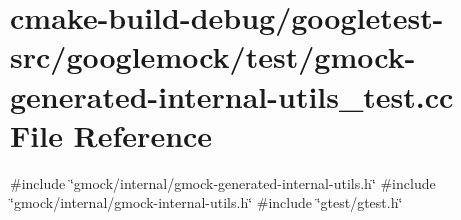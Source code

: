 \hypertarget{gmock-generated-internal-utils__test_8cc}{}\section{cmake-\/build-\/debug/googletest-\/src/googlemock/test/gmock-\/generated-\/internal-\/utils\+\_\+test.cc File Reference}
\label{gmock-generated-internal-utils__test_8cc}
{\ttfamily \#include \char`\"{}gmock/internal/gmock-\/generated-\/internal-\/utils.\+h\char`\"{}}\newline
{\ttfamily \#include \char`\"{}gmock/internal/gmock-\/internal-\/utils.\+h\char`\"{}}\newline
{\ttfamily \#include \char`\"{}gtest/gtest.\+h\char`\"{}}\newline
